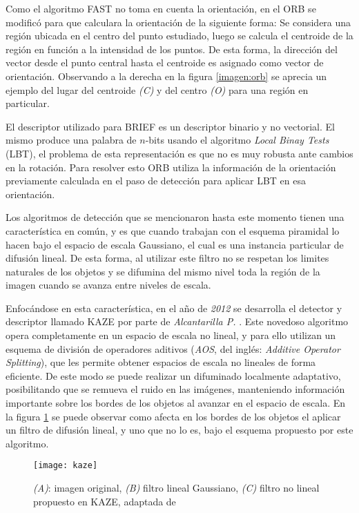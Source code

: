 Como el algoritmo FAST no toma en cuenta la orientación, en el ORB se modificó para que calculara la orientación de la siguiente forma: Se considera una región ubicada en el centro del punto estudiado, luego se calcula el centroide de la región en función a la intensidad de los puntos. De esta forma, la dirección del vector desde el punto central  hasta el centroide es asignado como vector de orientación. Observando a la derecha en la figura \ref{imagen:orb} se aprecia un ejemplo del lugar del centroide \textit{(C)} y del centro \textit{(O)} para una región en particular.

El descriptor utilizado para BRIEF es un descriptor binario y no vectorial. El mismo produce una palabra de $n$-bits usando el algoritmo \textit{Local Binay Tests} (LBT), el problema de esta representación es que no es muy robusta ante cambios en la rotación. Para resolver esto ORB utiliza la información de la orientación previamente calculada en el paso de detección para aplicar LBT en esa orientación.

Los algoritmos de detección que se mencionaron hasta este momento tienen una característica en común, y es que cuando trabajan con el esquema piramidal lo hacen bajo el espacio de escala Gaussiano, el cual es una instancia particular de difusión lineal. De esta forma, al utilizar este filtro no se respetan los limites naturales de los objetos y se difumina del mismo nivel toda la región de la imagen cuando se avanza entre niveles de escala.

Enfocándose en esta característica, en el año de \textit{2012} se desarrolla el detector y descriptor llamado KAZE \cite{kaze} por parte de \textit{Alcantarilla P. }. Este novedoso algoritmo opera completamente en un espacio de escala no lineal, y para ello utilizan un esquema de división de operadores aditivos (\textit{AOS}, del inglés: \textit{Additive Operator Splitting}), que les permite obtener espacios de escala no lineales de forma eficiente. De este modo se puede realizar un difuminado localmente adaptativo, posibilitando que se remueva el ruido en las imágenes, manteniendo información importante sobre los bordes de los objetos al avanzar en el espacio de escala. En la figura \ref{imagen:kaze} se puede observar como afecta en los bordes de los objetos el aplicar un filtro de difusión lineal, y uno que no lo es, bajo el esquema propuesto por este algoritmo.

\begin{figure}[H]
	\centering
	\texttt{[image: kaze]}
	\caption[Filtro no lineal propuesto por KAZE]{\textit{(A)}: imagen original, \textit{(B)} filtro lineal Gaussiano, \textit{(C)} filtro no lineal propuesto en KAZE, adaptada de \cite{kaze}}
	\label{imagen:kaze}
\end{figure}


